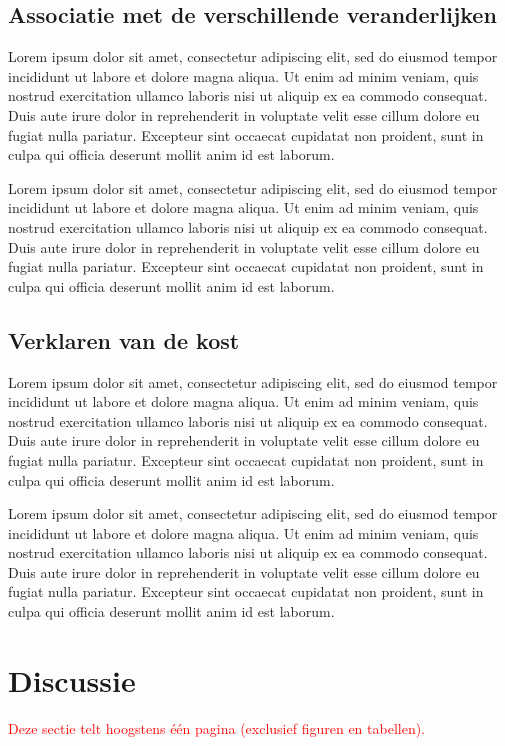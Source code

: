 \documentclass[a4paper]{kulakarticle}
\newcommand{\rood}[1]{\textcolor{red}{#1}}
\begin{document}
	\subsection{Associatie met de verschillende veranderlijken}
	Lorem ipsum dolor sit amet, consectetur adipiscing elit, sed do eiusmod tempor incididunt ut labore et dolore magna aliqua. Ut enim ad minim veniam, quis nostrud exercitation ullamco laboris nisi ut aliquip ex ea commodo consequat. Duis aute irure dolor in reprehenderit in voluptate velit esse cillum dolore eu fugiat nulla pariatur. Excepteur sint occaecat cupidatat non proident, sunt in culpa qui officia deserunt mollit anim id est laborum.
	
	Lorem ipsum dolor sit amet, consectetur adipiscing elit, sed do eiusmod tempor incididunt ut labore et dolore magna aliqua. Ut enim ad minim veniam, quis nostrud exercitation ullamco laboris nisi ut aliquip ex ea commodo consequat. Duis aute irure dolor in reprehenderit in voluptate velit esse cillum dolore eu fugiat nulla pariatur. Excepteur sint occaecat cupidatat non proident, sunt in culpa qui officia deserunt mollit anim id est laborum.
	
	\subsection{Verklaren van de kost}
	Lorem ipsum dolor sit amet, consectetur adipiscing elit, sed do eiusmod tempor incididunt ut labore et dolore magna aliqua. Ut enim ad minim veniam, quis nostrud exercitation ullamco laboris nisi ut aliquip ex ea commodo consequat. Duis aute irure dolor in reprehenderit in voluptate velit esse cillum dolore eu fugiat nulla pariatur. Excepteur sint occaecat cupidatat non proident, sunt in culpa qui officia deserunt mollit anim id est laborum.
	
	Lorem ipsum dolor sit amet, consectetur adipiscing elit, sed do eiusmod tempor incididunt ut labore et dolore magna aliqua. Ut enim ad minim veniam, quis nostrud exercitation ullamco laboris nisi ut aliquip ex ea commodo consequat. Duis aute irure dolor in reprehenderit in voluptate velit esse cillum dolore eu fugiat nulla pariatur. Excepteur sint occaecat cupidatat non proident, sunt in culpa qui officia deserunt mollit anim id est laborum.
	
	\section{Discussie}
	\rood{Deze sectie telt hoogstens één pagina (exclusief figuren en tabellen).}
\end{document}

